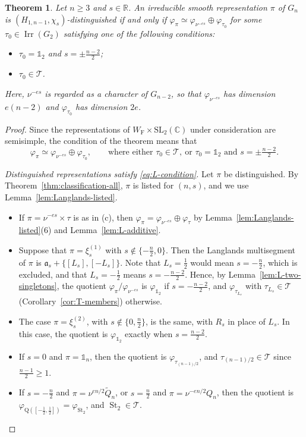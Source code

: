 \documentclass[11pt]{amsart}
\numberwithin{equation}{section}
\theoremstyle{plain}
\newtheorem{theorem}{Theorem}[section]
\theoremstyle{definition}
\theoremstyle{remark}
\newcommand{\R}{\mathbb{R}}
\newcommand{\C}{\mathbb{C}}
\newcommand{\one}{\mathds{1}}
\newcommand{\T}{\mathcal{T}}
\DeclareMathOperator{\Irr}{Irr}
\DeclareMathOperator{\St}{St}
\newcommand{\Qt}{\widetilde{Q}}
\newcommand{\xione}{\xi^{(1)}}
\newcommand{\xitwo}{\xi^{(2)}}
\newcommand{\aaa}{\mathfrak{a}}
\newcommand{\Qq}{\mathrm{Q}}
\begin{document}
\begin{theorem}\label{thm:langlands}
	Let $n\ge3$ and $s\in\R$. An irreducible smooth representation $\pi$ of $G_n$ is $(H_{1,n-1},\chi_s)$-distinguished if and only if
	$\varphi_{\pi}\simeq\varphi_{\nu^{-es}}\oplus\varphi_{\tau_0}$
	for some $\tau_0\in\Irr(G_2)$ satisfying one of the following conditions:
	\begin{itemize}
		\item $\tau_0=\one_2$ and $s=\pm\frac{n-2}2$;
		\item $\tau_0\in\T$.
	\end{itemize}
	Here, $\nu^{-es}$ is regarded as a character of $G_{n-2}$, so that $\varphi_{\nu^{-es}}$ has dimension $e(n-2)$ and $\varphi_{\tau_0}$ has dimension $2e$.
\end{theorem}

\begin{proof}
	Since the representations of $W_{\mathrm{F}}\times\mathrm{SL}_2(\C)$ under consideration are semisimple, the condition of the theorem means that
	\begin{equation}\label{eq:L-condition}
		\varphi_{\pi}\simeq\varphi_{\nu^{-es}}\oplus\varphi_{\tau_0},\qquad\text{where either }\tau_0\in\T,\ \text{or }\tau_0=\one_2\text{ and }s=\pm\tfrac{n-2}2.
	\end{equation}
	
	\emph{Distinguished representations satisfy \eqref{eq:L-condition}.} Let $\pi$ be distinguished. By Theorem~\ref{thm:classification-all}, $\pi$ is listed for $(n,s)$, and we use Lemma~\ref{lem:Langlands-listed}.
	\begin{itemize}
		\item If $\pi=\nu^{-es}\times\tau$ is as in (c), then $\varphi_{\pi}=\varphi_{\nu^{-es}}\oplus\varphi_{\tau}$ by Lemma~\ref{lem:Langlands-listed}(6) and Lemma~\ref{lem:L-additive}.
		\item Suppose that $\pi=\xione_s$ with $s\notin\{-\frac n2,0\}$. Then the Langlands multisegment of $\pi$ is $\aaa_s+\{[L_s],[-L_s]\}$. Note that $L_s=\frac12$ would mean $s=-\frac n2$, which is excluded, and that $L_s=-\frac12$ means $s=-\frac{n-2}2$. Hence, by Lemma~\ref{lem:L-two-singletons}, the quotient $\varphi_{\pi}/\varphi_{\nu^{-es}}$ is $\varphi_{\one_2}$ if $s=-\frac{n-2}2$, and $\varphi_{\tau_{L_s}}$ with $\tau_{L_s}\in\T$ (Corollary~\ref{cor:T-members}) otherwise.
		\item The case $\pi=\xitwo_s$, with $s\notin\{0,\frac n2\}$, is the same, with $R_s$ in place of $L_s$. In this case, the quotient is $\varphi_{\one_2}$ exactly when $s=\frac{n-2}2$.
		\item If $s=0$ and $\pi=\one_n$, then the quotient is $\varphi_{\tau_{(n-1)/2}}$, and $\tau_{(n-1)/2}\in\T$ since $\frac{n-1}2\ge1$.
		\item If $s=-\frac n2$ and $\pi=\nu^{en/2}\Qt_n$, or $s=\frac n2$ and $\pi=\nu^{-en/2}Q_n$, then the quotient is $\varphi_{\Qq([-\frac12,\frac12])}=\varphi_{\St_2}$, and $\St_2\in\T$.
	\end{itemize}
	

\end{proof}
\end{document}
